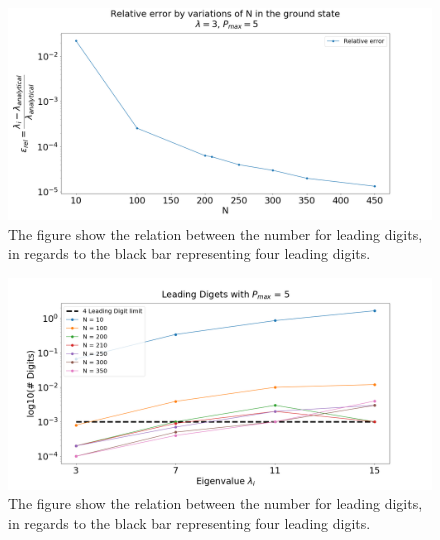 \documentclass[%
reprint,
amsmath,amssymb,
aps,
]{revtex4-1}
\begin{document}
\begin{figure}[!h]
	\includegraphics[scale = 0.3]{Relative_error_rho_5.png}
	\caption{\label{fig:RE} The figure show the relation between the number for leading digits, in regards to the black bar representing four leading digits.}
\end{figure}
\begin{figure}[!h]
	\includegraphics[scale = 0.3]{Leading_digits.png}
	\caption{\label{fig:LD} The figure show the relation between the number for leading digits, in regards to the black bar representing four leading digits.}
\end{figure}
\end{document}
